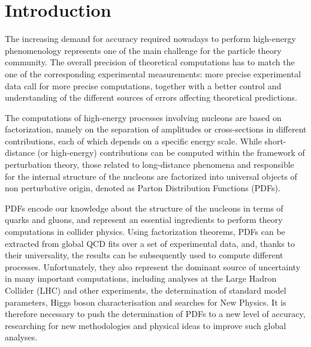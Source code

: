 \chapter*{Introduction}
The increasing demand for accuracy required nowadays to perform high-energy phenomenology
represents one of the main challenge for the particle theory community. The
overall precision of theoretical computations has to match the one of the corresponding
experimental measurements: more precise  
experimental data call for more precise computations, together with a better control
and understanding of the different sources of errors affecting theoretical predictions. 

The computations of high-energy processes involving nucleons are based on factorization, namely on the separation
of amplitudes or cross-sections in different contributions, each of which depends on a specific energy scale.
While short-distance (or high-energy) contributions can be computed within the framework of perturbation theory,
those related to long-distance phenomena and responsible for the internal
structure of the nucleons are factorized into universal objects of non perturbative origin,
denoted as Parton Distribution Functions (PDFs).
 
PDFs encode our knowledge about the structure of the nucleons in terms of quarks and
gluons, and represent an essential ingredients to perform theory computations in collider physics.
Using factorization theorems, PDFs can be extracted from global QCD fits
over a set of experimental data, and, thanks to their universality, the results can be subsequently used
to compute different processes. 
Unfortunately, they also represent the dominant source of uncertainty in many important computations,
including analyses at the Large Hadron Collider (LHC) and other experiments,
the determination of standard model parameters, Higgs boson characterisation and searches for New Physics.
It is therefore necessary to push the determination of PDFs to a new level of accuracy,
researching for new methodologies and physical ideas to improve such global analyses.

